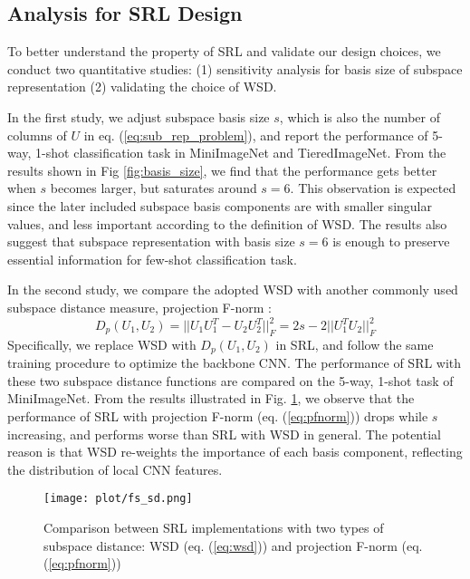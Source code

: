 \subsection{Analysis for SRL Design}
To better understand the property of SRL and validate our design choices, we conduct two quantitative studies: (1) sensitivity analysis for basis size of subspace representation (2) validating the choice of WSD.

In the first study, we adjust subspace basis size $s$, which is also the number of columns of $U$ in eq. (\ref{eq:sub_rep_problem}), and report the performance of 5-way, 1-shot classification task in MiniImageNet and TieredImageNet.
From the results shown in Fig \ref{fig:basis_size}, we find that the performance gets better when $s$ becomes larger, but saturates around $s=6$.
This observation is expected since the later included subspace basis components are with smaller singular values, and less important according to the definition of WSD.
The results also suggest that subspace representation with basis size $s=6$ is enough to preserve essential information for few-shot classification task.

In the second study, we compare the adopted WSD with another commonly used subspace distance measure, projection F-norm \cite{simon2020adaptive,edelman1998geometry}:
\begin{equation}
    D_p(U_1, U_2) = ||U_1U_1^T-U_2U_2^T||_F^2 = 2s-2||U_1^TU_2||_F^2
\label{eq:pfnorm}
\end{equation}
Specifically, we replace WSD with $D_p(U_1, U_2)$ in SRL, and follow the same training procedure to optimize the backbone CNN.
The performance of SRL with these two subspace distance functions are compared on the 5-way, 1-shot task of MiniImageNet.
From the results illustrated in Fig. \ref{fig:sd}, we observe that the performance of SRL with projection F-norm (eq. (\ref{eq:pfnorm})) drops while $s$ increasing, and performs worse than SRL with WSD in general.
The potential reason is that WSD re-weights the importance of each basis component, reflecting the distribution of local CNN features.

\begin{figure}[t]
    \centering
    \texttt{[image: plot/fs\_sd.png]}
    \caption{Comparison between SRL implementations with two types of subspace distance: WSD (eq. (\ref{eq:wsd})) and projection F-norm (eq. (\ref{eq:pfnorm}))}
    \label{fig:sd}
\end{figure}


